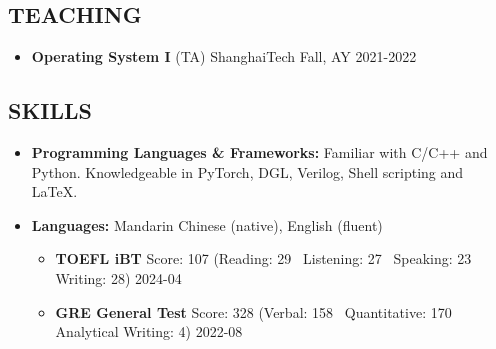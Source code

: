 \documentclass[a4paper,10pt]{ctexart} %
\begin{document}
\begin{keepsection}
\subsection{TEACHING}

    \begin{itemize}
        \item \textbf{Operating System I} (TA) \hfill ShanghaiTech \quad Fall, AY 2021-2022
    \end{itemize}
\end{keepsection}



\begin{keepsection}

\section{SKILLS}
\begin{itemize}
    \item \textbf{Programming Languages \& Frameworks:} Familiar with C/C++ and Python. Knowledgeable in PyTorch, DGL, Verilog, Shell scripting and \LaTeX.
    \item \textbf{Languages:} Mandarin Chinese (native), English (fluent)
        \begin{itemize}
            \item \textbf{TOEFL iBT} \quad Score: 107 {\small (Reading: 29 \, Listening: 27 \, Speaking: 23 \, Writing: 28)} \hfill 2024-04
            \item \textbf{GRE General Test} \quad Score: 328 {\small (Verbal: 158 \, Quantitative: 170 \, Analytical Writing: 4)} \hfill 2022-08
        \end{itemize}
\end{itemize}

\end{keepsection}


\end{document}
